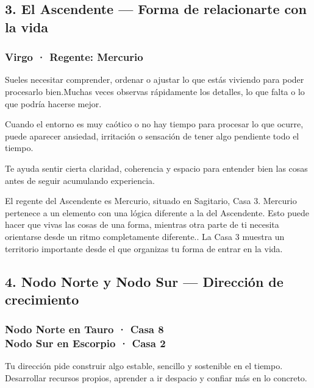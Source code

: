 \documentclass[11pt,a4paper]{article}
\begin{document}
\subsection{3. El Ascendente — Forma de relacionarte con la vida}

\subsubsection*{Virgo · Regente: Mercurio}

Sueles necesitar comprender, ordenar o ajustar lo que estás viviendo para poder procesarlo bien.Muchas veces observas rápidamente los detalles, lo que falta o lo que podría hacerse mejor.

Cuando el entorno es muy caótico o no hay tiempo para procesar lo que ocurre, puede aparecer ansiedad, irritación o sensación de tener algo pendiente todo el tiempo.

Te ayuda sentir cierta claridad, coherencia y espacio para entender bien las cosas antes de seguir acumulando experiencia.

El regente del Ascendente es Mercurio, situado en Sagitario, Casa 3. Mercurio pertenece a un elemento con una lógica diferente a la del Ascendente. Esto puede hacer que vivas las cosas de una forma, mientras otra parte de ti necesita orientarse desde un ritmo completamente diferente.. La Casa 3 muestra un territorio importante desde el que organizas tu forma de entrar en la vida.

\vspace{0.6cm}

\subsection{4. Nodo Norte y Nodo Sur — Dirección de crecimiento}

\subsubsection*{Nodo Norte en Tauro · Casa 8 \\
Nodo Sur en Escorpio · Casa 2}

Tu dirección pide construir algo estable, sencillo y sostenible en el tiempo. Desarrollar recursos propios, aprender a ir despacio y confiar más en lo concreto.
\end{document}
